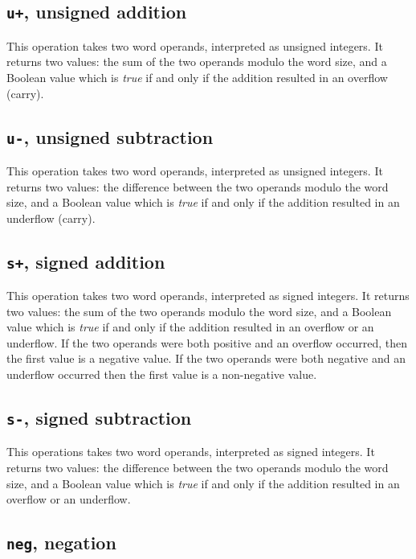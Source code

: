 \subsection{\texttt{u+}, unsigned addition}

This operation takes two word operands, interpreted as unsigned
integers.  It returns two values: the sum of the two operands modulo
the word size, and a Boolean value which is \emph{true} if and only if
the addition resulted in an overflow (carry).  

\subsection{\texttt{u-}, unsigned subtraction}

This operation takes two word operands, interpreted as unsigned
integers.  It returns two values: the difference between the two
operands modulo the word size, and a Boolean value which is
\emph{true} if and only if the addition resulted in an underflow
(carry).

\subsection{\texttt{s+}, signed addition}

This operation takes two word operands, interpreted as signed
integers.  It returns two values: the sum of the two operands modulo
the word size, and a Boolean value which is \emph{true} if and only if
the addition resulted in an overflow or an underflow.  If the two
operands were both positive and an overflow occurred, then the first
value is a negative value.  If the two operands were both negative and
an underflow occurred then the first value is a non-negative value. 

\subsection{\texttt{s-}, signed subtraction}

This operations takes two word operands, interpreted as signed
integers.  It returns two values: the difference between the two
operands modulo the word size, and a Boolean value which is
\emph{true} if and only if the addition resulted in an overflow or an
underflow.%

\subsection{\texttt{neg}, negation}

